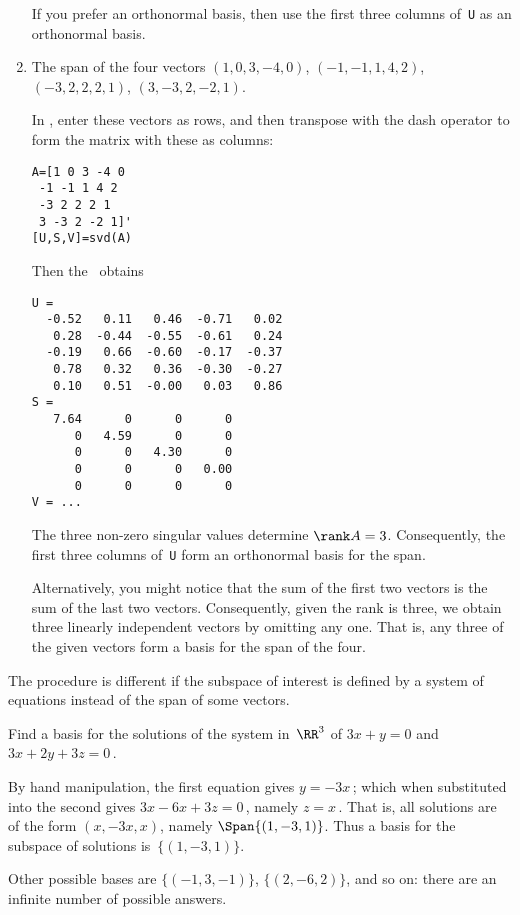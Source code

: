 \begin{example}
\begin{enumerate}
\begin{solution}
If you prefer an orthonormal basis, then use the first three columns of~\verb|U| as an orthonormal basis. 
\end{solution}



\item The span of the four vectors
\((1,0,3,-4,0)\), 
\((-1,-1,1,4,2)\), 
\((-3,2,2,2,1)\), 
\((3,-3,2,-2,1)\).
\begin{solution} 
In \script, enter these vectors as rows, and then transpose with the dash operator to form the matrix with these as columns:
\begin{verbatim}
A=[1 0 3 -4 0
 -1 -1 1 4 2
 -3 2 2 2 1
 3 -3 2 -2 1]'
[U,S,V]=svd(A)
\end{verbatim}
\setbox\ajrqrbox\hbox{}%
\marginpar{\usebox{\ajrqrbox}}%
Then the \svd\ obtains \twodp
\begin{verbatim}
U =
  -0.52   0.11   0.46  -0.71   0.02
   0.28  -0.44  -0.55  -0.61   0.24
  -0.19   0.66  -0.60  -0.17  -0.37
   0.78   0.32   0.36  -0.30  -0.27
   0.10   0.51  -0.00   0.03   0.86
S =
   7.64      0      0      0
      0   4.59      0      0
      0      0   4.30      0
      0      0      0   0.00
      0      0      0      0
V = ...
\end{verbatim}
The three non-zero singular values determine  \(\rank A=3\).
Consequently, the first three columns of~\verb|U| form an orthonormal basis for the span. 

Alternatively, you might notice that the sum of the first two vectors is the sum of the last two vectors.
Consequently, given the rank is three, we obtain three linearly independent vectors by omitting any one.
That is, any three of the given vectors form a basis for the span of the four.
\end{solution}

\end{enumerate}
\end{example}


The procedure is different if the subspace of interest is defined by a system of equations instead of the span of some vectors.

\begin{example} \label{eg:bas2sys}
Find a basis for the solutions of the system in~\(\RR^3\) of \(3x+y=0\) and \(3x+2y+3z=0\)\,.
\begin{solution} 
By hand manipulation, the first equation gives \(y=-3x\)\,; which when substituted into the second gives \(3x-6x+3z=0\)\,, namely \(z=x\)\,.  
That is, all solutions are of the form \((x,-3x,x)\), namely \(\Span\{(1,-3,1)\}\).
Thus a basis for the subspace of solutions is~\(\{(1,-3,1)\}\).

Other possible bases are \(\{(-1,3,-1)\}\),  \(\{(2,-6,2)\}\), and so on: there are an infinite number of possible answers.
\end{solution}
\end{example}




